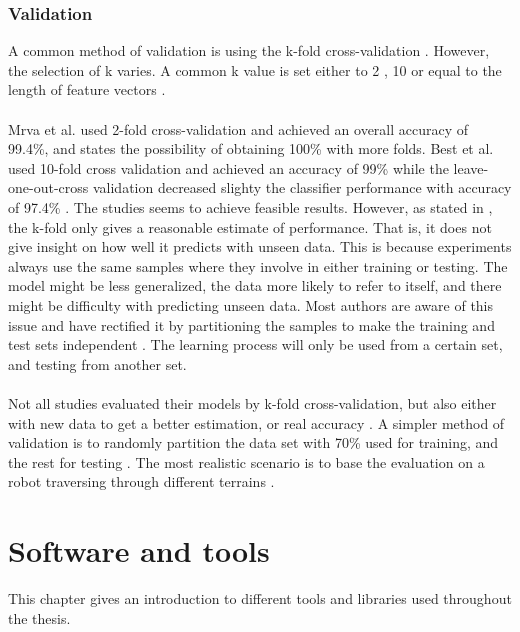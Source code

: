 \documentclass[USenglish]{ifimaster}  %
\begin{document}
\subsection{Validation}\label{subseq:validation}
A common method of validation is using the k-fold cross-validation  \cite{DBLP:conf/itat/MrvaF15,6784609,6386243,Hoffmann20141790,6849778,7387710}. However, the selection of k varies. A common k value is set either to 2  \cite{DBLP:conf/itat/MrvaF15,6784609}, 10 \cite{26b23e912c654fe4b7478fd910130195,6386243,Hoffmann20141790,6849778,7387710} or equal to the length of feature vectors \cite{26b23e912c654fe4b7478fd910130195}.
\\
\\
Mrva et al. \cite{DBLP:conf/itat/MrvaF15} used 2-fold cross-validation and achieved an overall accuracy of 99.4\%, and states the possibility of obtaining 100\% with more folds. Best et al. \cite{26b23e912c654fe4b7478fd910130195} used 10-fold cross validation and achieved an accuracy of 99\% while the leave-one-out-cross validation decreased slighty the classifier performance with accuracy of 97.4\% . The studies seems to achieve feasible results. However, as stated in \cite{7387710}, the k-fold only gives a reasonable estimate of performance. That is, it does not give insight on how well it predicts with unseen data. This is because experiments always use the same samples where they involve in either training or testing. The model might be less generalized, the data  more likely to refer to itself, and there might be difficulty with predicting unseen data. Most authors are aware of this issue and have rectified it by partitioning the samples to make the training and test sets independent \cite{26b23e912c654fe4b7478fd910130195}. The learning process will only be used from a certain set, and testing from another set.
\\
\\
Not all studies evaluated their models by k-fold cross-validation, but also either with new data to get a better estimation, or real accuracy \cite{5509309,Walas2015,5752869}. A simpler method of validation is to randomly partition the data set with 70\% used for training, and the rest for testing \cite{5752869}. The most realistic scenario is to base the evaluation on a robot traversing through different terrains \cite{DBLP:conf/itat/MrvaF15}.

\chapter{Software and tools} \label{chap:software}
This chapter gives an introduction to different tools and libraries used throughout the thesis.
\end{document}
